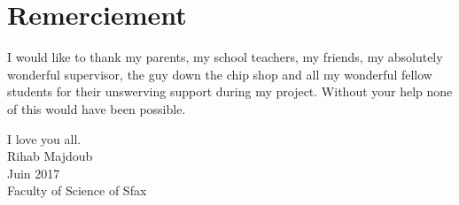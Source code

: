\cleardoublepage
\section*{Remerciement}
\vspace{1.0in}
I would like to thank my parents, my school teachers, my friends, my
absolutely wonderful supervisor, the guy down the chip shop and all
my wonderful fellow students for their unswerving support during my
project. Without your help none of this would have been possible.

I love you all. \\[0.2in]
Rihab Majdoub \\[0.2in]
Juin 2017 \\
Faculty of Science of Sfax
